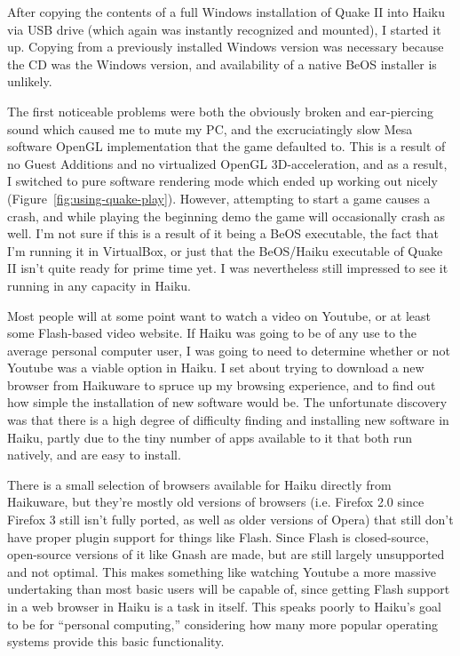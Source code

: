 \documentclass{article}
\newcommand{\figref}[1]{Figure~\ref{fig:#1}}
\begin{document}
After copying the contents of a full Windows installation of Quake II
into Haiku via USB drive (which again was instantly recognized and
mounted), I started it up. Copying from a previously installed Windows
version was necessary because the CD was the Windows version, and
availability of a native BeOS installer is unlikely.

The first noticeable problems were both the obviously broken and
ear-piercing sound which caused me to mute my PC, and the
excruciatingly slow Mesa software OpenGL implementation that the game
defaulted to.  This is a result of no Guest Additions and no
virtualized OpenGL 3D-acceleration, and as a result, I switched to
pure software rendering mode which ended up working out nicely
(\figref{using-quake-play}).  However, attempting to start a game
causes a crash, and while playing the beginning demo the game will
occasionally crash as well.  I'm not sure if this is a result of it
being a BeOS executable, the fact that I'm running it in VirtualBox,
or just that the BeOS/Haiku executable of Quake II isn't quite ready
for prime time yet.  I was nevertheless still impressed to see it
running in any capacity in Haiku.
	
Most people will at some point want to watch a video on Youtube, or at
least some Flash-based video website.  If Haiku was going to be of any
use to the average personal computer user, I was going to need to
determine whether or not Youtube was a viable option in Haiku.  I set
about trying to download a new browser from Haikuware to spruce up my
browsing experience, and to find out how simple the installation of
new software would be. The unfortunate discovery was that there is a
high degree of difficulty finding and installing new software in
Haiku, partly due to the tiny number of apps available to it that both
run natively, and are easy to install.

There is a small selection of browsers available for Haiku directly
from Haikuware, but they're mostly old versions of browsers
(i.e. Firefox 2.0 since Firefox 3 still isn't fully ported, as well as
older versions of Opera) that still don't have proper plugin support
for things like Flash.  Since Flash is closed-source, open-source
versions of it like Gnash are made, but are still largely unsupported
and not optimal.  This makes something like watching Youtube a more
massive undertaking than most basic users will be capable of, since
getting Flash support in a web browser in Haiku is a task in itself.
This speaks poorly to Haiku's goal to be for ``personal computing,''
considering how many more popular operating systems provide this basic
functionality.
\end{document}
